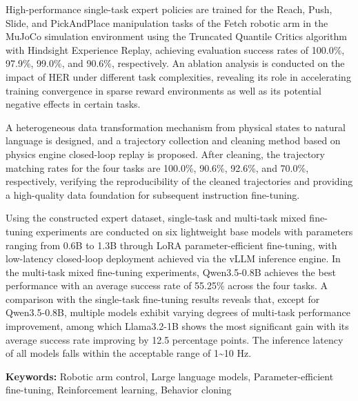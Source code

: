     High-performance single-task expert policies are trained for the Reach, Push, Slide, and PickAndPlace manipulation tasks of the Fetch robotic arm in the MuJoCo simulation environment using the Truncated Quantile Critics algorithm with Hindsight Experience Replay, achieving evaluation success rates of 100.0\%, 97.9\%, 99.0\%, and 90.6\%, respectively. An ablation analysis is conducted on the impact of HER under different task complexities, revealing its role in accelerating training convergence in sparse reward environments as well as its potential negative effects in certain tasks.

    A heterogeneous data transformation mechanism from physical states to natural language is designed, and a trajectory collection and cleaning method based on physics engine closed-loop replay is proposed. After cleaning, the trajectory matching rates for the four tasks are 100.0\%, 90.6\%, 92.6\%, and 70.0\%, respectively, verifying the reproducibility of the cleaned trajectories and providing a high-quality data foundation for subsequent instruction fine-tuning.

    Using the constructed expert dataset, single-task and multi-task mixed fine-tuning experiments are conducted on six lightweight base models with parameters ranging from 0.6B to 1.3B through LoRA parameter-efficient fine-tuning, with low-latency closed-loop deployment achieved via the vLLM inference engine. In the multi-task mixed fine-tuning experiments, Qwen3.5-0.8B achieves the best performance with an average success rate of 55.25\% across the four tasks. A comparison with the single-task fine-tuning results reveals that, except for Qwen3.5-0.8B, multiple models exhibit varying degrees of multi-task performance improvement, among which Llama3.2-1B shows the most significant gain with its average success rate improving by 12.5 percentage points. The inference latency of all models falls within the acceptable range of 1\textasciitilde10 Hz. 
    


\noindent\textbf{Keywords: }Robotic arm control, Large language models, Parameter-efficient fine-tuning, Reinforcement learning, Behavior cloning
